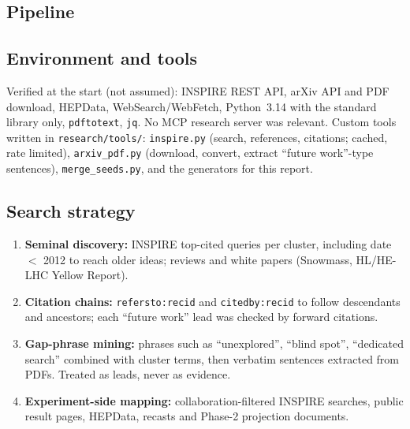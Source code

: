 \documentclass[11pt,a4paper]{article}
\begin{document}
\subsection{Pipeline}
\begin{center}\end{center}
\subsection{Environment and tools}
Verified at the start (not assumed): INSPIRE REST API, arXiv API and PDF download, HEPData, WebSearch/WebFetch, Python~3.14 with the standard library only, \texttt{pdftotext}, \texttt{jq}. No MCP research server was relevant. Custom tools written in \texttt{research/tools/}: \texttt{inspire.py} (search, references, citations; cached, rate limited), \texttt{arxiv\_pdf.py} (download, convert, extract ``future work''-type sentences), \texttt{merge\_seeds.py}, and the generators for this report.
\subsection{Search strategy}
\begin{enumerate}
\item \textbf{Seminal discovery:} INSPIRE top-cited queries per cluster, including date $<$ 2012 to reach older ideas; reviews and white papers (Snowmass, HL/HE-LHC Yellow Report).
\item \textbf{Citation chains:} \texttt{refersto:recid} and \texttt{citedby:recid} to follow descendants and ancestors; each ``future work'' lead was checked by forward citations.
\item \textbf{Gap-phrase mining:} phrases such as ``unexplored'', ``blind spot'', ``dedicated search'' combined with cluster terms, then verbatim sentences extracted from PDFs. Treated as leads, never as evidence.
\item \textbf{Experiment-side mapping:} collaboration-filtered INSPIRE searches, public result pages, HEPData, recasts and Phase-2 projection documents.
\end{enumerate}
\end{document}
